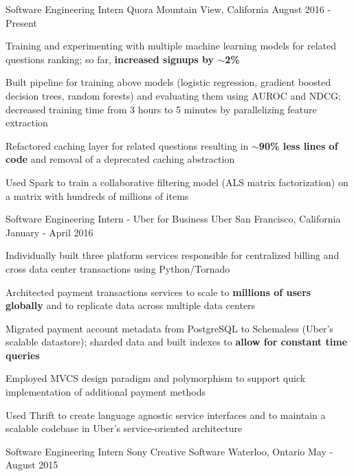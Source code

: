\begin{cventries}
  \cventry
    {Software Engineering Intern}
    {Quora}
    {Mountain View, California}
    {August 2016 - Present}
    {
      \begin{cvitems}
      \item Training and experimenting with multiple machine learning models for related questions ranking; so far, \textbf{increased signups by $\sim$2\%}
      \item Built pipeline for training above models (logistic regression, gradient boosted decision trees, random forests) and evaluating them using AUROC and NDCG; decreased training time from 3 hours to 5 minutes by parallelizing feature extraction
      \item Refactored caching layer for related questions resulting in \textbf{$\sim$90\% less lines of code} and removal of a deprecated caching abstraction
      \item Used Spark to train a collaborative filtering model (ALS matrix factorization) on a matrix with hundreds of millions of items
      \end{cvitems}
    }
  \cventry
    {Software Engineering Intern - Uber for Business}
    {Uber}
    {San Francisco, California}
    {January - April 2016}
    {
      \begin{cvitems}
      \item Individually built three platform services responsible for centralized billing and cross data center transactions using Python/Tornado
      \item Architected payment transactions services to scale to \textbf{millions of users globally} and to replicate data across multiple data centers
      \item Migrated payment account metadata from PostgreSQL to Schemaless (Uber's scalable datastore); sharded data and built indexes to \textbf{allow for constant time queries}
      \item Employed MVCS design paradigm and polymorphism to support quick implementation of additional payment methods
      \item Used Thrift to create language agnostic service interfaces and to maintain a scalable codebase in Uber's service-oriented architecture
      \end{cvitems}
    }
  \cventry
    {Software Engineering Intern}
    {Sony Creative Software}
    {Waterloo, Ontario}
    {May - August 2015}
    {
      \begin{cvitems}

\end{cvitems}}
\end{cventries}
